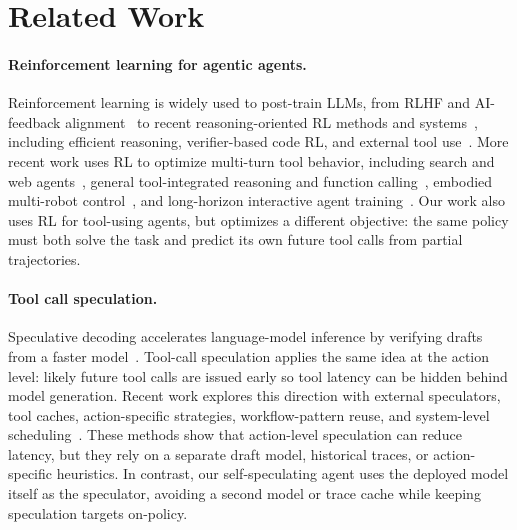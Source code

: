 \section{Related Work}
\label{sec:relatedwork}

\paragraph{Reinforcement learning for agentic agents.}
Reinforcement learning is widely used to post-train LLMs, from RLHF and
AI-feedback alignment~\citep{ouyang2022instructgpt,bai2022constitutionalai} to
recent reasoning-oriented RL methods and systems~\citep{shao2024deepseekmath,deepseekai2025r1,kimiteam2025kimi,yu2025dapo},
including efficient reasoning, verifier-based code RL, and external tool use~\citep{hou2025thinkprune,liu2025harnessllm,he2026hardtestgen,schick2023toolformer,patil2023gorilla,chen2023fireact,liu2024apigen,liu2026agentskills}.
More recent work uses RL to optimize multi-turn tool behavior, including search
and web agents~\citep{jin2025searchr1,song2025r1searcher,tan2025ragr1,qi2025webrl,zheng2025deepresearcher},
general tool-integrated reasoning and function calling~\citep{qian2025toolrl,zhang2025toolr1,li2025torl,feng2025retool,singh2025artist},
embodied multi-robot control~\citep{ji2025robotcontrol}, and long-horizon
interactive agent training~\citep{chen2025longhorizoninteractive,zeng2025turnlevelcredit,luo2025agentlightning}.
Our work also uses RL for tool-using agents, but optimizes a different
objective: the same policy must both solve the task and predict its own future
tool calls from partial trajectories.

\paragraph{Tool call speculation.}
Speculative decoding accelerates language-model inference by verifying drafts
from a faster model~\citep{leviathan2023speculativedecoding}. Tool-call
speculation applies the same idea at the action level: likely future tool calls
are issued early so tool latency can be hidden behind model generation. Recent
work explores this direction with external speculators, tool caches,
action-specific strategies, workflow-pattern reuse, and system-level
scheduling~\citep{ye2026speculativeactions,nichols2025speculativetoolcalls,zhong2026dualspec,sui2026paste,huang2025spagent,hooper2026speculativeinteraction}.
These methods show that action-level speculation can reduce latency, but they
rely on a separate draft model, historical traces, or action-specific heuristics.
In contrast, our self-speculating agent uses the deployed model itself as the
speculator, avoiding a second model or trace cache while keeping speculation
targets on-policy.
